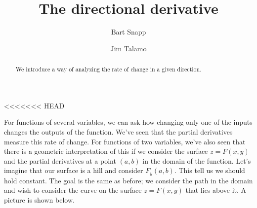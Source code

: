 \documentclass{ximera}
\author{Bart Snapp \and Jim Talamo}
\title[Dig-In:]{The directional derivative}
\begin{document}
\begin{abstract}
  We introduce a way of analyzing the rate of change in a given
  direction.
\end{abstract}
\maketitle

<<<<<<< HEAD

For functions of several variables, we can ask how changing only one of the inputs changes the outputs of the function.  We've seen that the partial derivatives measure this rate of change.  For functions of two variables, we've also seen that there is a geometric interpretation of this if we consider the surface $z=F(x,y)$ and the partial derivatives at a point $(a,b)$ in the domain of the function.  
Let's imagine that our surface is a hill and consider $F_y(a,b)$.  This tell us we should hold  constant.  The goal is the same as before; we consider the path  in the domain and wish to consider the curve on the surface $z=F(x,y)$ that lies above it.  A picture is shown below.
\end{document}
